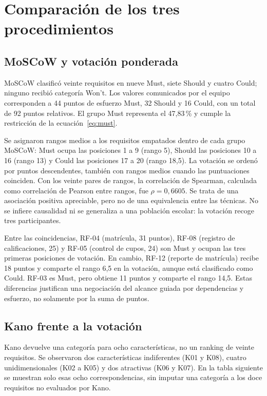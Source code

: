 \section{Comparación de los tres procedimientos}
\label{sec:comparacion}

\subsection{MoSCoW y votación ponderada}

MoSCoW clasificó veinte requisitos en nueve Must, siete Should y cuatro Could; ninguno recibió categoría Won't. Los valores comunicados por el equipo corresponden a 44 puntos de esfuerzo Must, 32 Should y 16 Could, con un total de 92 puntos relativos. El grupo Must representa el 47,83\,\% y cumple la restricción de la ecuación~\eqref{eq:must}.

Se asignaron rangos medios a los requisitos empatados dentro de cada grupo MoSCoW: Must ocupa las posiciones 1 a 9 (rango 5), Should las posiciones 10 a 16 (rango 13) y Could las posiciones 17 a 20 (rango 18,5). La votación se ordenó por puntos descendentes, también con rangos medios cuando las puntuaciones coinciden. Con los veinte pares de rangos, la correlación de Spearman, calculada como correlación de Pearson entre rangos, fue \(\rho=0{,}6605\). Se trata de una asociación positiva apreciable, pero no de una equivalencia entre las técnicas. No se infiere causalidad ni se generaliza a una población escolar: la votación recoge tres participantes.



Entre las coincidencias, RF-04 (matrícula, 31 puntos), RF-08 (registro de calificaciones, 25) y RF-05 (control de cupos, 24) son Must y ocupan las tres primeras posiciones de votación. En cambio, RF-12 (reporte de matrícula) recibe 18 puntos y comparte el rango 6,5 en la votación, aunque está clasificado como Could. RF-03 es Must, pero obtiene 11 puntos y comparte el rango 14,5. Estas diferencias justifican una negociación del alcance guiada por dependencias y esfuerzo, no solamente por la suma de puntos.

\subsection{Kano frente a la votación}

Kano devuelve una categoría para ocho características, no un ranking de veinte requisitos. Se observaron dos características indiferentes (K01 y K08), cuatro unidimensionales (K02 a K05) y dos atractivas (K06 y K07). En la tabla siguiente se muestran solo esas ocho correspondencias, sin imputar una categoría a los doce requisitos no evaluados por Kano.

